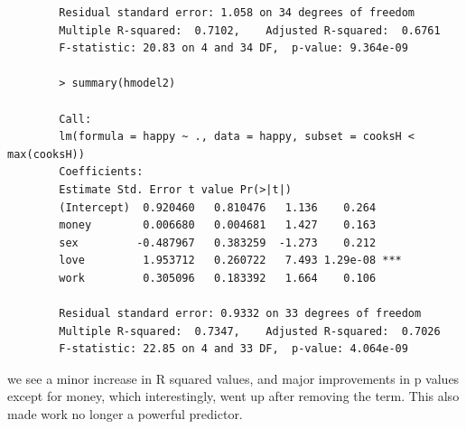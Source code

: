 \documentclass[11pt]{article}
\begin{document}
\begin{enumerate}
\begin{verbatim}
	 	Residual standard error: 1.058 on 34 degrees of freedom
	 	Multiple R-squared:  0.7102,	Adjusted R-squared:  0.6761 
	 	F-statistic: 20.83 on 4 and 34 DF,  p-value: 9.364e-09
	 	
	 	> summary(hmodel2)
	 	
	 	Call:
	 	lm(formula = happy ~ ., data = happy, subset = cooksH < max(cooksH))
	 	Coefficients:
	 	Estimate Std. Error t value Pr(>|t|)    
	 	(Intercept)  0.920460   0.810476   1.136    0.264    
	 	money        0.006680   0.004681   1.427    0.163    
	 	sex         -0.487967   0.383259  -1.273    0.212    
	 	love         1.953712   0.260722   7.493 1.29e-08 ***
	 	work         0.305096   0.183392   1.664    0.106    
	 	
	 	Residual standard error: 0.9332 on 33 degrees of freedom
	 	Multiple R-squared:  0.7347,	Adjusted R-squared:  0.7026 
	 	F-statistic: 22.85 on 4 and 33 DF,  p-value: 4.064e-09
	 \end{verbatim}
	 we see a minor increase in R squared values, and major improvements in p values except for money, which interestingly, went up after removing the term. This also made work no longer a powerful predictor.
\end{enumerate}
\end{document}
